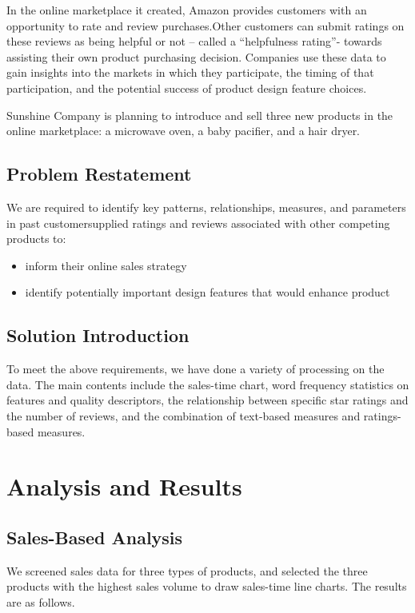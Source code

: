 \documentclass{mcmthesis}
\begin{document}
	In the online marketplace it created, Amazon provides customers with an opportunity to rate and review purchases.Other customers can submit ratings on these reviews as being helpful or not – called a “helpfulness rating”- towards assisting their own product purchasing decision. Companies use these data to gain insights into the markets in which they participate, the timing of that participation, and the potential success of product design feature choices.
	
	Sunshine Company is planning to introduce and sell three new products in the online marketplace: a microwave oven, a baby pacifier, and a hair dryer.
	
	\subsection{Problem Restatement}
	
	We are required to  identify key patterns, relationships, measures, and parameters in past customersupplied ratings and reviews associated with other competing products to:
	\begin{itemize}
		\item 
		inform their online sales strategy
		\item
		identify potentially important design features that would enhance product
	\end{itemize}
	
	\subsection{Solution Introduction}
	
	To meet the above requirements, we have done a variety of processing on the data. The main contents include the sales-time chart, word frequency statistics on features and quality descriptors, the relationship between specific star ratings and the number of reviews, and the combination of  text-based measures and ratings-based measures.
	
	\section{Analysis and Results}
	
	\subsection{Sales-Based Analysis}
	We screened sales data for three types of products, and selected the three products with the highest sales volume to draw sales-time line charts. The results are as follows.
	
\end{document}

